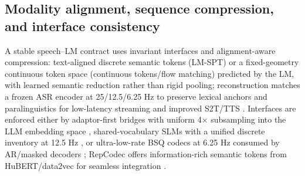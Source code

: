 \documentclass{article}
\begin{document}
\subsection{Modality alignment, sequence compression, and interface consistency} \label{subsec:Modality alignment, sequence compression, and interface consistency}
A stable speech--LM contract uses invariant interfaces and alignment-aware compression: text-aligned discrete semantic tokens (LM-SPT) or a fixed-geometry continuous token space (continuous tokens/flow matching) predicted by the LM, with learned semantic reduction rather than rigid pooling; reconstruction matches a frozen ASR encoder at 25/12.5/6.25 Hz to preserve lexical anchors and paralinguistics for low-latency streaming and improved S2T/TTS \cite{jo2025lmsptalignedsemanticdistillationspeechto,yuan2024continuousspeechtokensmakesllmsrobustmul}. Interfaces are enforced either by adaptor-first bridges with uniform 4$\times$ subsampling into the LLM embedding space \cite{wang2023slmbridgethingapbetweenspeechtextfoundat}, shared-vocabulary SLMs with a unified discrete inventory at 12.5 Hz \cite{zeng2024scalingspeechtextpretrainingsyntheticint}, or ultra-low-rate BSQ codecs at 6.25 Hz consumed by AR/masked decoders \cite{wang2025tadicodectextawarediffusionspeechtokeniz}; RepCodec offers information-rich semantic tokens from HuBERT/data2vec for seamless integration \cite{huang2024repcodecspeechrepresentationcodectokeniz}.
\end{document}
